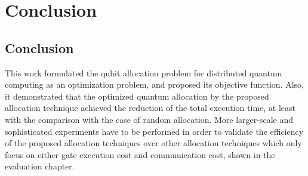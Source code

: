 \chapter{Conclusion}
\label{conclusion}
\section{Conclusion}
This work formulated the qubit allocation problem for distributed quantum computing as an optimization problem, and proposed its objective function.  Also, it demonstrated that the optimized quantum allocation by the proposed allocation technique achieved the reduction of the total execution time, at least with the comparison with the case of random allocation.  More larger-scale and sophisticated experiments have to be performed in order to validate the efficiency of the proposed allocation techniques over other allocation techniques which only focus on either gate execution cost and communication cost, shown in the evaluation chapter.

